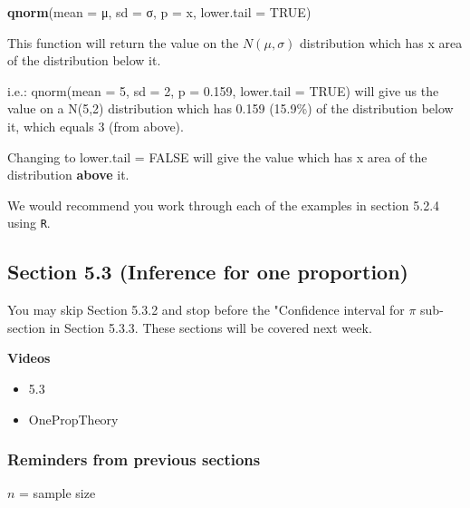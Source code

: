 \documentclass[
]{report}
\newenvironment{Shaded}{\begin{snugshade}}{\end{snugshade}}
\newcommand{\DataTypeTok}[1]{\textcolor[rgb]{0.13,0.29,0.53}{#1}}
\newcommand{\KeywordTok}[1]{\textcolor[rgb]{0.13,0.29,0.53}{\textbf{#1}}}
\newcommand{\NormalTok}[1]{#1}
\newcommand{\OtherTok}[1]{\textcolor[rgb]{0.56,0.35,0.01}{#1}}
\providecommand{\tightlist}{%
  \setlength{\itemsep}{0pt}\setlength{\parskip}{0pt}}
\begin{document}
\begin{Shaded}
\begin{Highlighting}[]
\KeywordTok{qnorm}\NormalTok{(}\DataTypeTok{mean =}\NormalTok{ μ, }\DataTypeTok{sd =}\NormalTok{ σ, }\DataTypeTok{p =}\NormalTok{ x, }\DataTypeTok{lower.tail =} \OtherTok{TRUE}\NormalTok{)}
\end{Highlighting}
\end{Shaded}

This function will return the value on the \(N(\mu,\sigma)\) distribution which has x area of the distribution below it.

i.e.: qnorm(mean = 5, sd = 2, p = 0.159, lower.tail = TRUE) will give us the value on a N(5,2) distribution which has 0.159 (15.9\%) of the distribution below it, which equals 3 (from above).

Changing to lower.tail = FALSE will give the value which has x area of the distribution \textbf{above} it.

We would recommend you work through each of the examples in section 5.2.4 using \texttt{R}.

\hypertarget{section-5.3-inference-for-one-proportion}{%
\subsection{Section 5.3 (Inference for one proportion)}\label{section-5.3-inference-for-one-proportion}}


You may skip Section 5.3.2 and stop before the "Confidence interval for \(\pi\) sub-section in Section 5.3.3. These sections will be covered next week.

\textbf{Videos}

\begin{itemize}
\tightlist
\item
  5.3
\item
  OnePropTheory
\end{itemize}


\hypertarget{reminders-from-previous-sections}{%
\subsubsection*{Reminders from previous sections}\label{reminders-from-previous-sections}}

\(n\) = sample size
\end{document}

